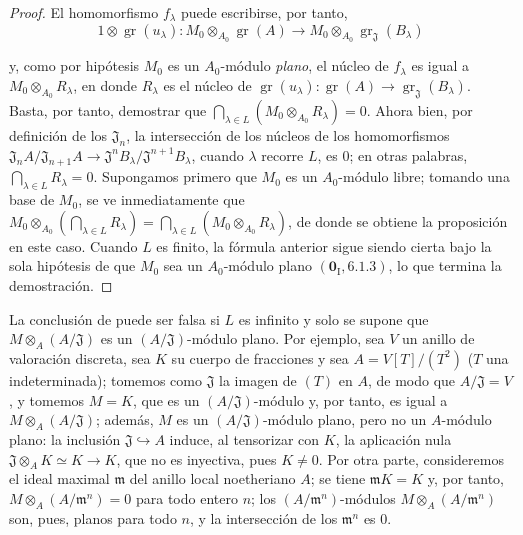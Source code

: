 \begin{proof}
El homomorfismo $f_\lambda$ puede escribirse, por tanto,
\[
1\otimes\operatorname{gr}(u_\lambda):
M_0\otimes_{A_0}\operatorname{gr}(A)
\longrightarrow M_0\otimes_{A_0}\operatorname{gr}_{\mathfrak J}(B_\lambda)
\]



y, como por hipótesis $M_0$ es un $A_0$-módulo \emph{plano}, el núcleo de $f_\lambda$ es igual a $M_0\otimes_{A_0}R_\lambda$,
en donde $R_\lambda$ es el núcleo de $\operatorname{gr}(u_\lambda):\operatorname{gr}(A)
\to\operatorname{gr}_{\mathfrak J}(B_\lambda)$. Basta, por tanto, demostrar que
$\bigcap_{\lambda\in L}(M_0\otimes_{A_0}R_\lambda)=0$. Ahora bien, por definición de los $\mathfrak J_n$, la intersección de los núcleos de los homomorfismos
$\mathfrak J_nA/\mathfrak J_{n+1}A
\longrightarrow\mathfrak J^nB_\lambda/\mathfrak J^{n+1}B_\lambda$, cuando $\lambda$ recorre $L$, es $0$; en otras
palabras, $\bigcap_{\lambda\in L}R_\lambda=0$. Supongamos primero que $M_0$ es un $A_0$-módulo libre; tomando
una base de $M_0$, se ve inmediatamente que $M_0\otimes_{A_0}(\bigcap_{\lambda\in L}R_\lambda)
=\bigcap_{\lambda\in L}(M_0\otimes_{A_0}R_\lambda)$, de donde se obtiene la
proposición en este caso. Cuando $L$ es finito, la fórmula anterior sigue siendo cierta bajo
la sola hipótesis de que $M_0$ sea un $A_0$-módulo plano $(\mathbf 0_{\mathrm I},6.1.3)$, lo que termina la
demostración.
\end{proof}

\begin{remark}[11.4.2]
\label{IV.11.4.2}
La conclusión de  puede ser falsa si $L$ es infinito
y solo se supone que $M\otimes_A(A/\mathfrak J)$ es un $(A/\mathfrak J)$-módulo plano. Por ejemplo,
sea $V$ un anillo de valoración discreta, sea $K$ su cuerpo de fracciones y sea $A=V[T]/(T^2)$
($T$ una indeterminada); tomemos como $\mathfrak J$ la imagen de $(T)$ en $A$, de modo que $A/\mathfrak J=V$, y
tomemos $M=K$, que es un $(A/\mathfrak J)$-módulo y, por tanto, es igual a $M\otimes_A(A/\mathfrak J)$; además, $M$ es
un $(A/\mathfrak J)$-módulo plano, pero no un $A$-módulo plano: la inclusión $\mathfrak J\hookrightarrow A$ induce, al tensorizar con $K$,
la aplicación nula $\mathfrak J\otimes_A K\simeq K\longrightarrow K$,
que no es inyectiva, pues $K\neq0$. Por otra parte, consideremos el ideal maximal $\mathfrak m$ del anillo local noetheriano
$A$; se tiene $\mathfrak mK=K$ y, por tanto, $M\otimes_A(A/\mathfrak m^n)=0$ para todo entero $n$; los $(A/\mathfrak m^n)$-módulos
$M\otimes_A(A/\mathfrak m^n)$ son, pues, planos para todo $n$, y la intersección de los $\mathfrak m^n$ es $0$.
\end{remark}

